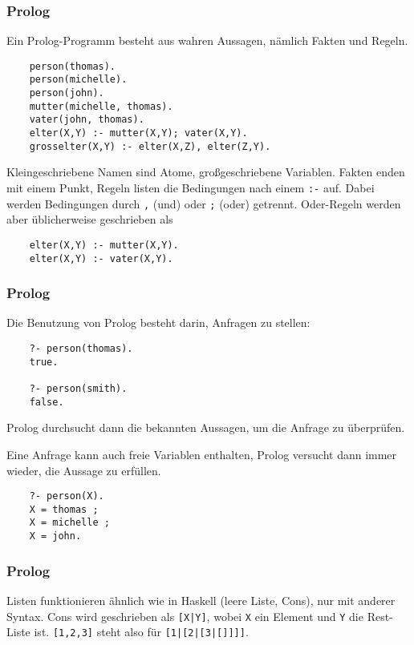 \documentclass{beamer}
\begin{document}
\prolog

\begin{frame}[fragile]
  \frametitle{Prolog}
  Ein Prolog-Programm besteht aus wahren Aussagen, nämlich Fakten und Regeln.
  \begin{lstlisting}
    person(thomas).
    person(michelle).
    person(john).
    mutter(michelle, thomas).
    vater(john, thomas).
    elter(X,Y) :- mutter(X,Y); vater(X,Y).
    grosselter(X,Y) :- elter(X,Z), elter(Z,Y).
  \end{lstlisting}
  Kleingeschriebene Namen sind Atome, großgeschriebene Variablen.
  Fakten enden mit einem Punkt,
  Regeln listen die Bedingungen nach einem \lstinline{:-} auf.
  Dabei werden Bedingungen durch \lstinline{,} (und) oder \lstinline{;} (oder) getrennt.
  Oder-Regeln werden aber üblicherweise geschrieben als
  \begin{lstlisting}
    elter(X,Y) :- mutter(X,Y).
    elter(X,Y) :- vater(X,Y).
  \end{lstlisting}
\end{frame}

\begin{frame}[fragile]
  \frametitle{Prolog}
  Die Benutzung von Prolog besteht darin, Anfragen zu stellen:
  \begin{lstlisting}
    ?- person(thomas).
    true.
    
    ?- person(smith).
    false.
  \end{lstlisting}
  Prolog durchsucht dann die bekannten Aussagen, um die Anfrage zu überprüfen.
  
  Eine Anfrage kann auch freie Variablen enthalten,
  Prolog versucht dann immer wieder, die Aussage zu erfüllen.
  \begin{lstlisting}
    ?- person(X).
    X = thomas ;
    X = michelle ;
    X = john.
  \end{lstlisting}
\end{frame}

\begin{frame}[fragile]
  \frametitle{Prolog}
  Listen funktionieren ähnlich wie in Haskell (leere Liste, Cons), nur mit anderer Syntax.
  Cons wird geschrieben als \lstinline{[X|Y]}, wobei \lstinline{X} ein Element und \lstinline{Y} die Rest-Liste ist.
  \lstinline{[1,2,3]} steht also für \lstinline{[1|[2|[3|[]]]]}.
\end{frame}
\end{document}
